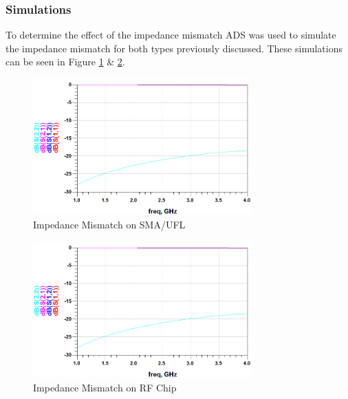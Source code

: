 \documentclass[12pt,openany,a4paper]{book}
\begin{document}
\subsubsection{Simulations}
To determine the effect of the impedance mismatch ADS was used to simulate the impedance mismatch for both types previously discussed. These simulations can be seen in Figure \ref{fig:imp-mismatch-1} \& \ref{fig:imp-mismatch-2}.
\begin{figure}[H]
	\centering
    \includegraphics[width=0.75\textwidth]{Track-Losses-missmatch.png}
	\caption{Impedance Mismatch on SMA/UFL}
	\label{fig:imp-mismatch-1}
\end{figure} 
\begin{figure}[H]
	\centering
    \includegraphics[width=0.75\textwidth]{Track-Losses-missmatch.png}
	\caption{Impedance Mismatch on RF Chip}
	\label{fig:imp-mismatch-2}
\end{figure} 
\end{document}
